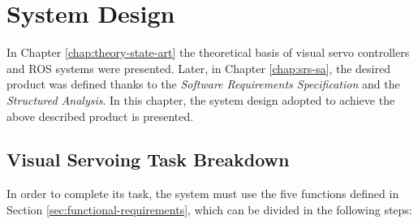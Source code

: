 
\chapter{System Design}
\label{chap:system-design}

In Chapter \ref{chap:theory-state-art} the theoretical basis of visual servo controllers and ROS systems were presented. Later, in Chapter \ref{chap:srs-sa}, the desired product was defined thanks to the \emph{Software Requirements Specification} and the \emph{Structured Analysis}. In this chapter, the system design adopted to achieve the above described product is presented.

\section{Visual Servoing Task Breakdown}
\label{ref:task-breakdown}

In order to complete its task, the system must use the five functions defined in Section \ref{sec:functional-requirements}, which can be divided in the following steps:

